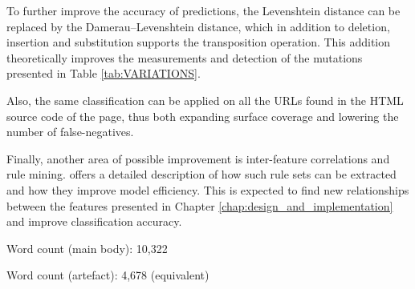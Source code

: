 To further improve the accuracy of predictions, the Levenshtein distance can be replaced by the Damerau–Levenshtein distance, which in addition to deletion, insertion and substitution supports the transposition operation. This addition theoretically improves the measurements and detection of the mutations presented in Table \ref{tab:VARIATIONS}.

Also, the same classification can be applied on all the URLs found in the HTML source code of the page, thus both expanding surface coverage and lowering the number of false-negatives.

Finally, another area of possible improvement is inter-feature correlations and rule mining. \cite{Jeeva} offers a detailed description of how such rule sets can be extracted and how they improve model efficiency. This is expected to find new relationships between the features presented in Chapter \ref{chap:design_and_implementation} and improve classification accuracy.

\clearpage
\vspace*{\fill}
\begin{center}
	\begin{minipage}{.6\textwidth}
		\centering
		Word count (main body): 10,322

		Word count (artefact): 4,678 (equivalent)
	\end{minipage}
\end{center}
\vfill
\clearpage